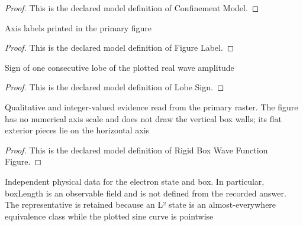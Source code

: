 \begin{proof}
  This is the declared model definition of Confinement Model.
\end{proof}
\begin{definition}
  \label{def:physics:phyx-mini-0656:phyxminiproblems-problemphyxmini0656-figurelabel}
  Axis labels printed in the primary figure
\end{definition}
\begin{proof}
  This is the declared model definition of Figure Label.
\end{proof}
\begin{definition}
  \label{def:physics:phyx-mini-0656:phyxminiproblems-problemphyxmini0656-lobesign}
  Sign of one consecutive lobe of the plotted real wave amplitude
\end{definition}
\begin{proof}
  This is the declared model definition of Lobe Sign.
\end{proof}
\begin{definition}
  \label{def:physics:phyx-mini-0656:phyxminiproblems-problemphyxmini0656-rigidboxwavefunctionfigure}
  Qualitative and integer-valued evidence read from the primary raster. The figure has no numerical axis scale and does not draw the vertical box walls; its flat exterior pieces lie on the horizontal axis
\end{definition}
\begin{proof}
  This is the declared model definition of Rigid Box Wave Function Figure.
\end{proof}
\begin{definition}
  \label{def:physics:phyx-mini-0656:phyxminiproblems-problemphyxmini0656-rigidboxelectronsetup}
  Independent physical data for the electron state and box. In particular, boxLength is an observable field and is not defined from the recorded answer. The representative is retained because an L² state is an almost-everywhere equivalence class while the plotted sine curve is pointwise
\end{definition}
